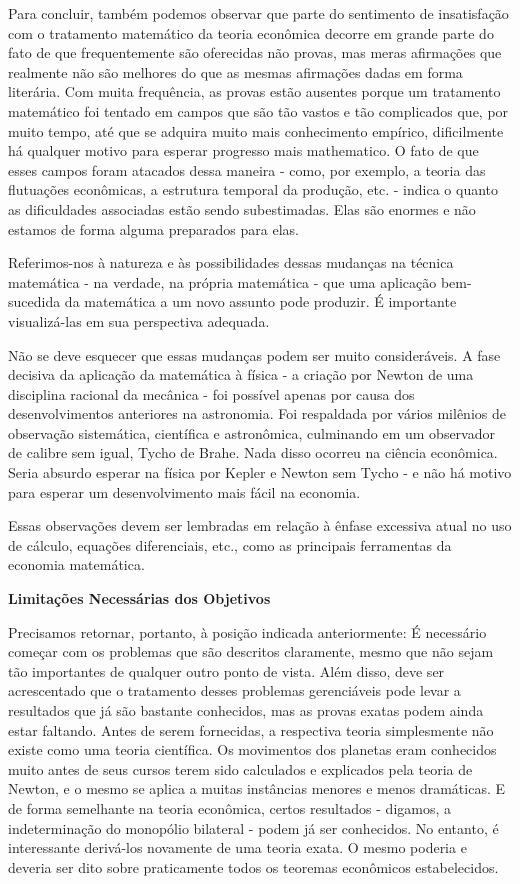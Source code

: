 \documentclass[a4paper,12pt]{article}[abntex2]
\begin{document}
Para concluir, também podemos observar que parte do sentimento de insatisfação com o tratamento matemático da teoria econômica decorre em grande parte do fato de que frequentemente são oferecidas não provas, mas meras afirmações que realmente não são melhores do que as mesmas afirmações dadas em forma literária. Com muita frequência, as provas estão ausentes porque um tratamento matemático foi tentado em campos que são tão vastos e tão complicados que, por muito tempo, até que se adquira muito mais conhecimento empírico, dificilmente há qualquer motivo para esperar progresso mais mathematico. O fato de que esses campos foram atacados dessa maneira - como, por exemplo, a teoria das flutuações econômicas, a estrutura temporal da produção, etc. - indica o quanto as dificuldades associadas estão sendo subestimadas. Elas são enormes e não estamos de forma alguma preparados para elas.

Referimos-nos à natureza e às possibilidades dessas mudanças na técnica matemática - na verdade, na própria matemática - que uma aplicação bem-sucedida da matemática a um novo assunto pode produzir. É importante visualizá-las em sua perspectiva adequada.

Não se deve esquecer que essas mudanças podem ser muito consideráveis. A fase decisiva da aplicação da matemática à física - a criação por Newton de uma disciplina racional da mecânica - foi possível apenas por causa dos desenvolvimentos anteriores na astronomia. Foi respaldada por vários milênios de observação sistemática, científica e astronômica, culminando em um observador de calibre sem igual, Tycho de Brahe. Nada disso ocorreu na ciência econômica. Seria absurdo esperar na física por Kepler e Newton sem Tycho - e não há motivo para esperar um desenvolvimento mais fácil na economia.

Essas observações devem ser lembradas em relação à ênfase excessiva atual no uso de cálculo, equações diferenciais, etc., como as principais ferramentas da economia matemática.

\textbf{Limitações Necessárias dos Objetivos}

Precisamos retornar, portanto, à posição indicada anteriormente: É necessário começar com os problemas que são descritos claramente, mesmo que não sejam tão importantes de qualquer outro ponto de vista. Além disso, deve ser acrescentado que o tratamento desses problemas gerenciáveis pode levar a resultados que já são bastante conhecidos, mas as provas exatas podem ainda estar faltando. Antes de serem fornecidas, a respectiva teoria simplesmente não existe como uma teoria científica. Os movimentos dos planetas eram conhecidos muito antes de seus cursos terem sido calculados e explicados pela teoria de Newton, e o mesmo se aplica a muitas instâncias menores e menos dramáticas. E de forma semelhante na teoria econômica, certos resultados - digamos, a indeterminação do monopólio bilateral - podem já ser conhecidos. No entanto, é interessante derivá-los novamente de uma teoria exata. O mesmo poderia e deveria ser dito sobre praticamente todos os teoremas econômicos estabelecidos.
\end{document}
